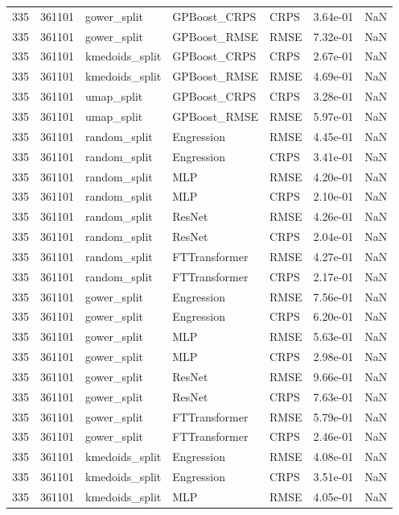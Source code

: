\begin{tabular}{rrlllrr}
335 & 361101 & gower\_split & GPBoost\_CRPS & CRPS & 3.64e-01 & NaN \\
335 & 361101 & gower\_split & GPBoost\_RMSE & RMSE & 7.32e-01 & NaN \\
335 & 361101 & kmedoids\_split & GPBoost\_CRPS & CRPS & 2.67e-01 & NaN \\
335 & 361101 & kmedoids\_split & GPBoost\_RMSE & RMSE & 4.69e-01 & NaN \\
335 & 361101 & umap\_split & GPBoost\_CRPS & CRPS & 3.28e-01 & NaN \\
335 & 361101 & umap\_split & GPBoost\_RMSE & RMSE & 5.97e-01 & NaN \\
335 & 361101 & random\_split & Engression & RMSE & 4.45e-01 & NaN \\
335 & 361101 & random\_split & Engression & CRPS & 3.41e-01 & NaN \\
335 & 361101 & random\_split & MLP & RMSE & 4.20e-01 & NaN \\
335 & 361101 & random\_split & MLP & CRPS & 2.10e-01 & NaN \\
335 & 361101 & random\_split & ResNet & RMSE & 4.26e-01 & NaN \\
335 & 361101 & random\_split & ResNet & CRPS & 2.04e-01 & NaN \\
335 & 361101 & random\_split & FTTransformer & RMSE & 4.27e-01 & NaN \\
335 & 361101 & random\_split & FTTransformer & CRPS & 2.17e-01 & NaN \\
335 & 361101 & gower\_split & Engression & RMSE & 7.56e-01 & NaN \\
335 & 361101 & gower\_split & Engression & CRPS & 6.20e-01 & NaN \\
335 & 361101 & gower\_split & MLP & RMSE & 5.63e-01 & NaN \\
335 & 361101 & gower\_split & MLP & CRPS & 2.98e-01 & NaN \\
335 & 361101 & gower\_split & ResNet & RMSE & 9.66e-01 & NaN \\
335 & 361101 & gower\_split & ResNet & CRPS & 7.63e-01 & NaN \\
335 & 361101 & gower\_split & FTTransformer & RMSE & 5.79e-01 & NaN \\
335 & 361101 & gower\_split & FTTransformer & CRPS & 2.46e-01 & NaN \\
335 & 361101 & kmedoids\_split & Engression & RMSE & 4.08e-01 & NaN \\
335 & 361101 & kmedoids\_split & Engression & CRPS & 3.51e-01 & NaN \\
335 & 361101 & kmedoids\_split & MLP & RMSE & 4.05e-01 & NaN \\

\end{tabular}

